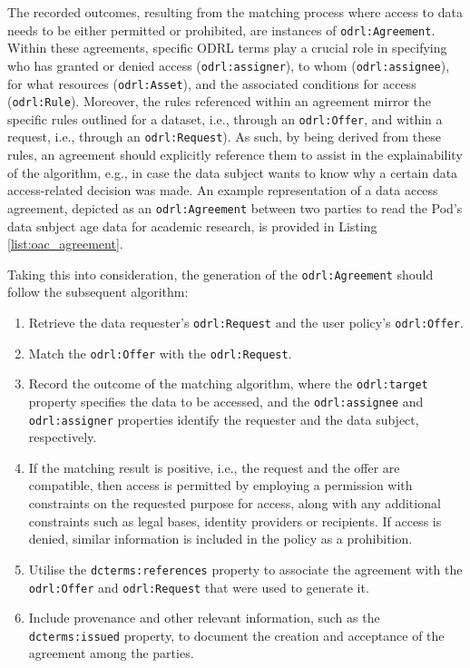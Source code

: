 The recorded outcomes, resulting from the matching process where access to data needs to be either permitted or prohibited, are instances of \texttt{odrl:Agreement}.
Within these agreements, specific ODRL terms play a crucial role in specifying who has granted or denied access (\texttt{odrl:assigner}), to whom (\texttt{odrl:assignee}), for what resources (\texttt{odrl:Asset}), and the associated conditions for access (\texttt{odrl:Rule}).
Moreover, the rules referenced within an agreement mirror the specific rules outlined for a dataset, i.e., through an \texttt{odrl:Offer}, and within a request, i.e., through an \texttt{odrl:Request}).
As such, by being derived from these rules, an agreement should explicitly reference them to assist in the explainability of the algorithm, e.g., in case the data subject wants to know why a certain data access-related decision was made.
An example representation of a data access agreement, depicted as an \texttt{odrl:Agreement} between two parties to read the Pod's data subject age data for academic research, is provided in Listing \ref{list:oac_agreement}.

Taking this into consideration, the generation of the \texttt{odrl:Agreement} should follow the subsequent algorithm:
\begin{enumerate}
    \item Retrieve the data requester's \texttt{odrl:Request} and the user policy's \texttt{odrl:Offer}.
    \item Match the \texttt{odrl:Offer} with the \texttt{odrl:Request}.
    \item Record the outcome of the matching algorithm, where the \texttt{odrl:target} property specifies the data to be accessed, and the \texttt{odrl:assignee} and \texttt{odrl:assigner} properties identify the requester and the data subject, respectively.
    \item If the matching result is positive, i.e., the request and the offer are compatible, then access is permitted by employing a permission with constraints on the requested purpose for access, along with any additional constraints such as legal bases, identity providers or recipients. If access is denied, similar information is included in the policy as a prohibition.
    \item Utilise the \texttt{dcterms:references} property to associate the agreement with the \texttt{odrl:Offer} and \texttt{odrl:Request} that were used to generate it.
    \item Include provenance and other relevant information, such as the \texttt{dcterms:issued} property, to document the creation and acceptance of the agreement among the parties.
\end{enumerate}

